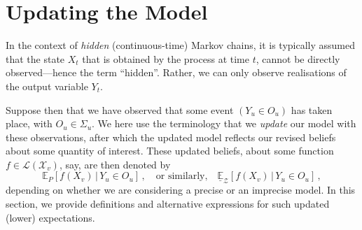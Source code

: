 \documentclass[twoside,11pt]{article}
\newcommand{\states}{\mathcal{X}}
\newcommand{\gambles}{\mathcal{L}}
\begin{document}
\section{Updating the Model}\label{sec:updating_model}

In the context of \emph{hidden} (continuous-time) Markov chains, it is typically assumed that the state $X_t$ that is obtained by the process at time $t$, cannot be directly observed---hence the term ``hidden''. Rather, we can only observe realisations of the output variable $Y_t$. %

Suppose then that we have observed that some event $(Y_u\in O_u)$ has taken place, with $O_u\in\Sigma_u$. We here use the terminology that we \emph{update} our model with these observations, after which the updated model reflects our revised beliefs about some quantity of interest. These updated beliefs, about some function $f\in\gambles(\states_v)$, say, are then denoted by
\begin{equation*}
\mathbb{E}_P[f(X_v)\,\vert\,Y_u\in O_u]\,,\quad\text{or similarly,}\quad\underline{\mathbb{E}}_\mathcal{Z}[f(X_v)\,\vert\,Y_u\in O_u]\,,
\end{equation*}
depending on whether we are considering a precise or an imprecise model. In this section, we provide definitions and alternative expressions for such updated (lower) expectations.


\end{document}

